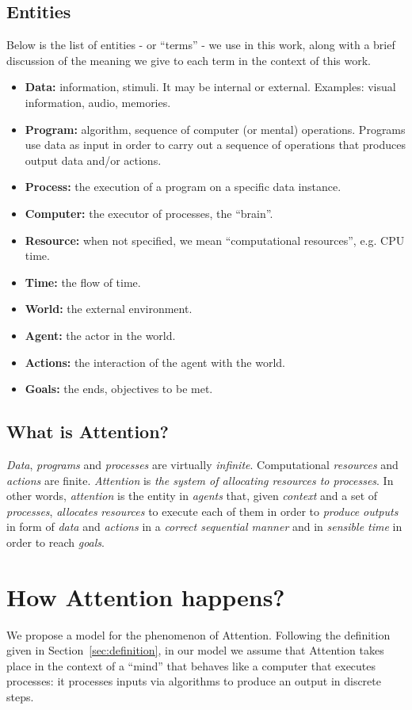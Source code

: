 \documentclass[11pt]{article}
\begin{document}
\subsection{Entities}
Below is the list of entities - or ``terms'' - we use in this work, along with a brief discussion of the meaning
we give to each term in the context of this work.

\begin{itemize}
    \item\textbf{Data:} information, stimuli. It may be internal or external. Examples: visual information, audio, memories.
    \item\textbf{Program:} algorithm, sequence of computer (or mental) operations. Programs use data as input in order to carry out a sequence of operations that produces output data and/or actions.
    \item\textbf{Process:} the execution of a program on a specific data instance.
    \item\textbf{Computer:} the executor of processes, the “brain”.
    \item\textbf{Resource:} when not specified, we mean “computational resources”, e.g. CPU time.
    \item\textbf{Time:} the flow of time.
    \item\textbf{World:} the external environment.
    \item\textbf{Agent:} the actor in the world.
    \item\textbf{Actions:} the interaction of the agent with the world.
    \item\textbf{Goals:} the ends, objectives to be met.
\end{itemize}

\subsection{What is Attention?}
\emph{Data}, \emph{programs} and \emph{processes} are virtually \emph{infinite}.
Computational \emph{resources} and \emph{actions} are finite.
\emph{Attention} is \emph{the system of allocating resources to processes}.
In other words, \emph{attention} is the entity in \emph{agents} that, given \emph{context} and a set of \emph{processes},
\emph{allocates} \emph{resources} to execute each of them in order to \emph{produce} \emph{outputs} in form of \emph{data} and \emph{actions} in a \emph{correct sequential manner} and in \emph{sensible time} in order to reach \emph{goals}.

\section{How Attention happens?}
We propose a model for the phenomenon of Attention.
Following the definition given in Section~\ref{sec:definition}, in our model we assume that Attention takes place in the context
of a ``mind'' that behaves like a computer that executes processes: it processes inputs via algorithms to produce an output in discrete steps.
\end{document}

